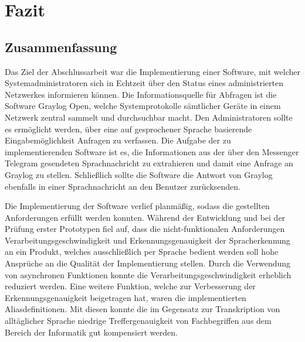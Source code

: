 \chapter{Fazit}
\label{cha:fazit}

\section{Zusammenfassung}

Das Ziel der Abschlussarbeit war die Implementierung einer Software, mit welcher Systemadministratoren sich in Echtzeit über den Status eines administrierten Netzwerkes informieren können. Die Informationsquelle für Abfragen ist die Software Graylog Open, welche Systemprotokolle sämtlicher Geräte in einem Netzwerk zentral sammelt und durchsuchbar macht. Den Administratoren sollte es ermöglicht werden, über eine auf gesprochener Sprache basierende Eingabemöglichkeit Anfragen zu verfassen. Die Aufgabe der zu implementierenden Software ist es, die Informationen aus der über den Messenger Telegram gesendeten Sprachnachricht zu extrahieren und damit eine Anfrage an Graylog zu stellen. Schließlich sollte die Software die Antwort von Graylog ebenfalls in einer Sprachnachricht an den Benutzer zurücksenden. 

Die Implementierung der Software verlief planmäßig, sodass die gestellten Anforderungen erfüllt werden konnten. Während der Entwicklung und bei der Prüfung erster Prototypen fiel auf, dass die nicht-funktionalen Anforderungen Verarbeitungsgeschwindigkeit und Erkennungsgenauigkeit der Spracherkennung an ein Produkt, welches ausschließlich per Sprache bedient werden soll hohe Ansprüche an die Qualität der Implementierung stellen. Durch die Verwendung von asynchronen Funktionen konnte die Verarbeitungsgeschwindigkeit erheblich reduziert werden. Eine weitere Funktion, welche zur Verbesserung der Erkennungsgenauigkeit beigetragen hat, waren die implementierten Aliasdefinitionen. Mit diesen konnte die im Gegensatz zur Transkription von alltäglicher Sprache niedrige Treffergenauigkeit von Fachbegriffen aus dem Bereich der Informatik gut kompensiert werden. 

